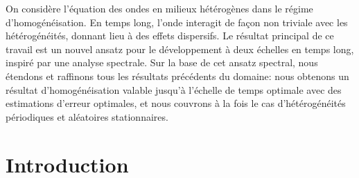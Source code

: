 \documentclass[JEP,XML,SOM,Unicode,published]{cedram}
\theoremstyle{plain}
\theoremstyle{definition}
\numberwithin{equation}{section}
\begin{document}




\begin{altabstract}
On considère l'équation des ondes en milieux hétérogènes dans le régime d'homogénéisation. En temps long, l'onde interagit de façon non triviale avec les hétérogénéités, donnant lieu à des effets dispersifs. Le résultat principal de ce travail est un nouvel ansatz pour le développement à deux échelles en temps long, inspiré par une analyse spectrale. Sur la base de cet ansatz spectral, nous étendons et raffinons tous les résultats précédents du domaine: nous obtenons un résultat d'homogénéisation valable jusqu'à l'échelle de temps optimale avec des estimations d'erreur optimales, et nous couvrons à la fois le cas d’hétérogénéités périodiques et aléatoires stationnaires.
\end{altabstract}

\maketitle
\vspace*{-\baselineskip}
\tableofcontents
\mainmatter

\section{Introduction}
\end{document}
